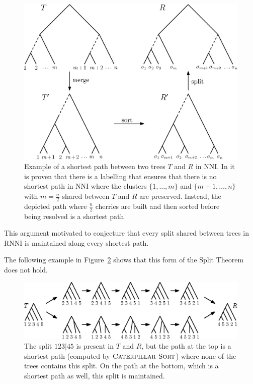 \documentclass{amsart}
\newcommand{\nni}{\mathrm{NNI}}
\newcommand{\rnni}{\mathrm{RNNI}}
\newcommand{\csort}{\textsc{Caterpillar Sort}}
\begin{document}
\begin{figure}[H]
\centering
\includegraphics[width=.8\textwidth]{NNI_NP_proof}
\vspace{12pt}
\caption{Example of a shortest path between two trees $T$ and $R$ in $\nni$.
In \autocite{Li1996-zw} it is proven that there is a labelling that ensures that there is no shortest path in $\nni$ where the clusters $\{1, \ldots, m\}$ and $\{m+1, \ldots, n\}$ with $m = \frac{n}{2}$ shared between $T$ and $R$ are preserved.
Instead, the depicted path where $\frac{n}{2}$ cherries are built and then sorted before being resolved is a shortest path}
\label{fig:NNI_NP_proof}
\end{figure}

This argument motivated \textcite[Conjecture~9]{Gavryushkin2018-ol} to conjecture that every split shared between trees in $\rnni$ is maintained along every shortest path.

The following example in Figure~\ref{fig:splitthm_counterexample} shows that this form of the Split Theorem does not hold.

\begin{figure}[H]
\centering
\includegraphics[width=\textwidth]{splitthm_counterexample}
\vspace{12pt}
\caption{The split $123|45$ is present in $T$ and $R$, but the path at the top is a shortest path (computed by $\csort$) where none of the trees contains this split.
On the path at the bottom, which is a shortest path as well, this split is maintained.}
\label{fig:splitthm_counterexample}
\end{figure}
\end{document}
